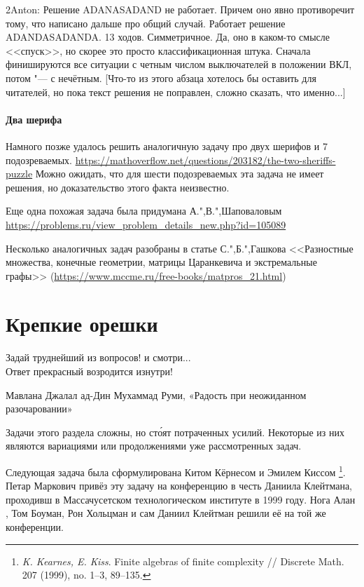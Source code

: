 \documentclass[twoside]{book}
\begin{document}
2Anton: Решение ADANASADAND не работает. Причем оно явно противоречит тому, что написано дальше про общий случай. 
Работает решение ADANDASADANDA. 13 ходов. Симметричное. Да, оно в каком-то смысле <<спуск>>, но скорее это просто 
классификационная штука. Сначала финишируются все ситуации с четным числом выключателей в положении ВКЛ, потом "--- с нечётным.
[Что-то из этого абзаца хотелось бы оставить для читателей, но пока текст решения не поправлен, сложно сказать,
что именно...]

\subsubsection*{Два шерифа}
Намного позже удалось решить аналогичную задачу про двух шерифов и 7 подозреваемых.
\url{https://mathoverflow.net/questions/203182/the-two-sheriffs-puzzle} Можно ожидать, что для шести подозреваемых эта задача не имеет решения, но доказательство этого факта неизвестно.

Еще одна похожая задача была придумана А.",В.",Шаповаловым
\url{https://problems.ru/view_problem_details_new.php?id=105089}

Несколько аналогичных задач разобраны в статье С.",Б.",Гашкова 
<<Разностные множества, конечные геометрии, матрицы Царанкевича и экстремальные графы>>
(\url{https://www.mccme.ru/free-books/matpros_21.html})



\chapter{Крепкие орешки}

\setlength{\epigraphwidth}{.55\textwidth}
\epigraph{Задай  труднейший  из  вопросов!  и  смотри...\\
Ответ  прекрасный  возродится  изнутри!\vspace{1ex}}{Мавлана Джалал ад-Дин Мухаммад Руми, «Радость   при   неожиданном разочаровании»
}

Задачи этого раздела сложны, но ст\'{о}ят потраченных усилий.
Некоторые из них являются вариациями или продолжениями уже рассмотренных задач.


Следующая задача была сформулирована
Китом Кёрнесом %
и Эмилем Киссом%
\footnote{\emph{K. Kearnes, E. Kiss}. Finite algebras of finite complexity /\!/ {Discrete Math.} 207 (1999), no. 1--3, 89--135.}.
Петар Маркович привёз эту задачу на конференцию в честь Даниила Клейтмана, проходивш в Массачусетском технологическом институте в 1999 году.
Нога Алан , Том Боуман, Рон Хольцман и сам Даниил Клейтман решили её на той же конференции.
\end{document}
